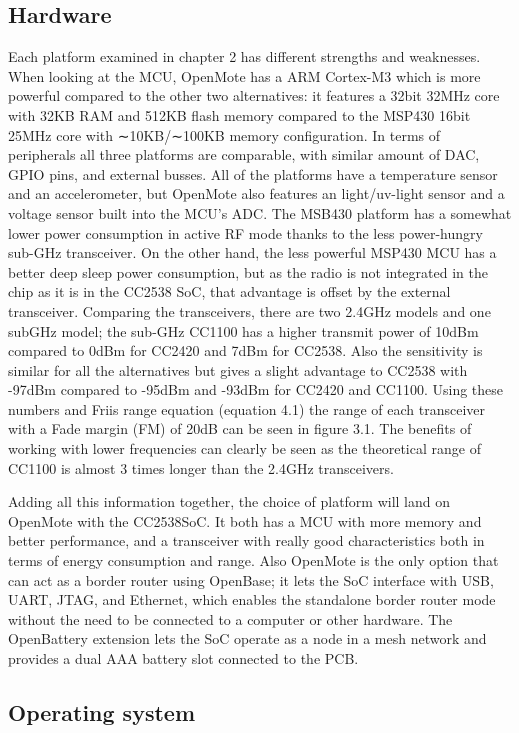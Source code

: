 \subsection{Hardware}
Each platform examined in chapter 2 has different strengths and weaknesses.
When looking at the MCU,
	OpenMote has a ARM Cortex-M3 which is more powerful compared to the other two alternatives:
	it features a 32bit 32MHz core with 32KB RAM and 512KB flash memory compared to the MSP430 16bit 25MHz core with ∼10KB/∼100KB memory configuration.
In terms of peripherals all three platforms are comparable,
	with similar amount of DAC,
	GPIO pins,
	and external busses.
All of the platforms have a temperature sensor and an accelerometer,
	but OpenMote also features an light/uv-light sensor and a voltage sensor built into the MCU’s ADC.
The MSB430 platform has a somewhat lower power consumption in active RF mode thanks to the less power-hungry sub-GHz transceiver.
On the other hand,
	the less powerful MSP430 MCU has a better deep sleep power consumption,
	but as the radio is not integrated in the chip as it is in the CC2538 SoC,
	that advantage is offset by the external transceiver.
Comparing the transceivers,
	there are two 2.4GHz models and one subGHz model;
	the sub-GHz CC1100 has a higher transmit power of 10dBm compared to 0dBm for CC2420 and 7dBm for CC2538.
Also the sensitivity is similar for all the alternatives but gives a slight advantage to CC2538 with -97dBm compared to -95dBm and -93dBm for CC2420 and CC1100.
Using these numbers and Friis range equation (equation 4.1) the range of each transceiver with a Fade margin (FM) of 20dB can be seen in figure 3.1.
The benefits of working with lower frequencies can clearly be seen as the theoretical range of CC1100 is almost 3 times longer than the 2.4GHz transceivers.

Adding all this information together,
	the choice of platform will land on OpenMote with the CC2538SoC.
It both has a MCU with more memory and better performance,
	and a transceiver with really good characteristics both in terms of energy consumption and range.
Also OpenMote is the only option that can act as a border router using OpenBase;
	it lets the SoC interface with USB,
	UART,
	JTAG,
	and Ethernet,
	which enables the standalone border router mode without the need to be connected to a computer or other hardware.
The OpenBattery extension lets the SoC operate as a node in a mesh network and provides a dual AAA battery slot connected to the PCB.

\subsection{Operating system}

